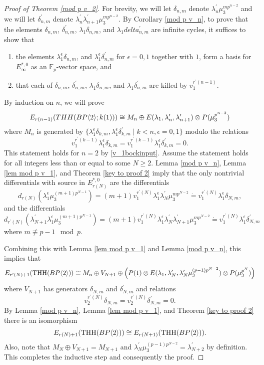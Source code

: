 \begin{proof}[Proof of Theorem \ref{mod p v_2}]
For brevity, we will let $\delta_{n,m}$ denote $\lambda_n^{\prime}\mu_3^{mp^{n-2}}$ and we will let $\delta_{n,m}^{\prime}$ denote $\lambda_n^{\prime}\lambda_{n+1}^{\prime}\mu_3^{mp^{n-2}}$.
By  Corollary \ref{mod p v_n}, to prove that the elements $\delta_{n,m}$, $\delta_{n,m}^{\prime}$, $\lambda_1\delta_{n,m}$, and $\lambda_1delta_{n,m}^{\prime}$ are infinite cycles, it suffices to show that
\begin{enumerate}
\item the elements $\lambda_1^\epsilon \delta_{n,m}$, and  $\lambda_1^{\epsilon} \delta_{n,m}^{\prime}$ for $\epsilon=0,1$ together with $1$, form a basis for $E_{\infty}^{*,0}$ as an $\mathbb{F}_p$-vector space, and 
\item that each of $\delta_{n,m}$, $\delta_{n,m}^{\prime}$, $\lambda_1\delta_{n,m}$, and $\lambda_1\delta_{n,m}^{\prime}$ are killed by $v_1^{r^{\prime}(n-1)}$. 
\end{enumerate}
By induction on $n$, we will prove
\[ E_{r(n-1)}(THH(BP\langle 2 \rangle;k(1)))\cong M_n\oplus E(\lambda_1,\lambda_{n}^{\prime},\lambda_{n+1}^{\prime})\otimes P(\mu_3^{p^{n-2}})\]
where $M_n$ is generated by $\{\lambda_1^{\epsilon} \delta_{k,m}, \lambda_1^{\epsilon} \delta_{k,m}^{\prime}\mid k<n, \epsilon=0,1\}$ modulo the relations 
\[v_1^{r^{\prime}(k-1)}\lambda_1^{\epsilon} \delta_{k,m}=v_1^{r^{\prime}(k-1)}\lambda_1^{\epsilon}\delta_{k,m}^{\prime}= 0.\]
This statement holds for $n=2$ by \eqref{v_1bockinput}. Assume the statement holds for all integers less than or equal to some $N\ge 2$. Lemma \ref{mod p v_n}, Lemma \ref{lem mod p v_1}, and Theorem \ref{key to proof 2} imply that the only nontrivial differentials with source in $E_{r(N)}^{*,0}$ are the differentials
\[ d_{r(N)}(\lambda_1^{\epsilon} \mu_3^{(m+1)p^{N-1}})=(m+1)v_1^{r^{\prime}(N)}\lambda_1^{\epsilon} \lambda_{N}^{\prime}\mu_3^{mp^{N-2}}\dot{=} v_1^{r^{\prime}(N)}\lambda_1^{\epsilon}\delta_{N,m},\]
and the differentials 
\[ d_{r^{\prime}(N)}(\lambda_{N+1}^{\prime}\lambda_1^{\epsilon} \mu_3^{(m+1)p^{N-1}})=(m+1)v_1^{r^{\prime}(N)}\lambda_1^{\epsilon} \lambda_N^{\prime}\lambda_{N+1}^{\prime}\mu_3^{mp^{N-2}}\dot{=} v_1^{r^{\prime}(N)}\lambda_1^{\epsilon} \delta_{N,m}^{\prime}\]
where $m\not \equiv p-1 \mod{p}$. 

Combining this with Lemma \ref{lem mod p v_1} and Lemma \ref{mod p v_n}, this implies that
\[ E_{r^{\prime}(N)+1}(\operatorname{THH}(BP\langle 2 \rangle))\cong M_n\oplus V_{N+1}\oplus \left ( P(1)\otimes E(\lambda_1, \lambda_{N}^{\prime},\lambda_{N}^{\prime}\mu_3^{(p-1)p^{N-2}} )\otimes P(\mu_3^{p^N})\right )\]
where $V_{N+1}$ has generators $\delta_{N,m}$ and $\delta_{N,m}^{\prime}$ and relations 
\[ v_2^{r^{\prime}(N)}\delta_{N,m}=v_2^{r^{\prime}(N)}\delta_{N,m}^{\prime}=0.\]
By Lemma \ref{mod p v_n}, Lemma \ref{lem mod p v_1}, and Theorem \ref{key to proof 2} there is an isomorphism
\[ E_{r(N)+1}(\operatorname{THH}(BP\langle 2 \rangle))\cong E_{r(N+1)}(\operatorname{THH}(BP\langle 2 \rangle)).\] 
Also, note that $M_N\oplus V_{N+1}=M_{N+1}$ and $\lambda_{N}^{\prime}\mu_3^{(p-1)p^{N-2}}=\lambda_{N+2}^{\prime}$ by definition. This completes the inductive step and consequently the proof.
\end{proof}
